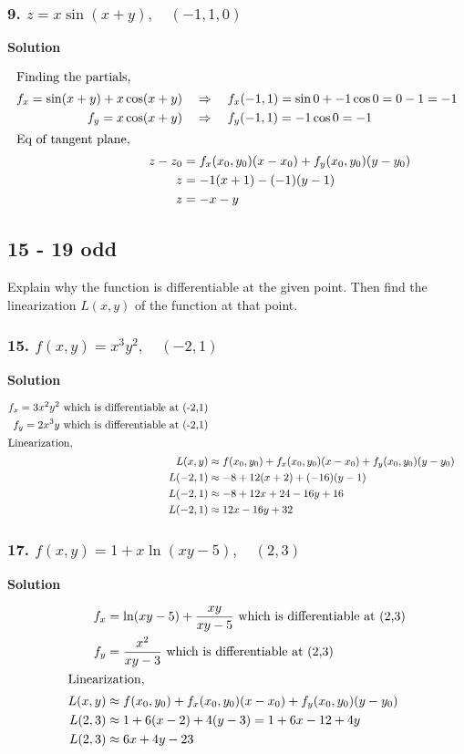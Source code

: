 \documentclass{article}
\newcommand\rr{\quad\Rightarrow\quad}
\newcommand{\solution}{\centerline{\textbf{Solution}}}
\begin{document}
\subsubsection*{9. $z = x\sin (x+y),\quad (-1, 1, 0)$}
\solution
\begin{align*}
    \intertext{Finding the partials,}
    f_x = \sin (x+y) + x\cos (x+y) &\rr f_x(-1,1) = \sin 0 + -1\cos 0 = 0 - 1 = -1 \\
    f_y = x\cos (x+y) &\rr f_y(-1,1) = -1\cos 0 = -1 \\
    \intertext{Eq of tangent plane,}
    z-z_0 &= f_x(x_0, y_0)(x-x_0) + f_y(x_0, y_0)(y-y_0) \\
    z &= -1(x+1) - (-1)(y-1) \\
    z &= -x - y 
\end{align*}
\subsection*{15 - 19 odd}
Explain why the function is differentiable at the given point. Then find the linearization $L(x,y)$ of the function at that point.
\subsubsection*{15. $f(x,y) = x^3y^2,\quad (-2,1)$}
\solution 
\begin{align*}
    f_x = 3x^2y^2 \text{ which is differentiable at (-2,1)} \\
    f_y = 2x^3y \text{ which is differentiable at (-2,1)} \\
    \intertext{Linearization,}
    L(x,y) &\approx f(x_0, y_0) + f_x(x_0,y_0)(x-x_0) + f_y(x_0,y_0)(y-y_0) \\
    L(-2,1) &\approx -8 + 12(x+2) + (-16)(y-1) \\
    L(-2,1) &\approx -8 + 12x + 24 - 16y + 16 \\
    L(-2,1) &\approx 12x - 16y + 32
\end{align*}
\subsubsection*{17. $f(x,y) = 1 + x\ln (xy-5),\quad (2,3)$}
\solution
\begin{align*}
    f_x &= \ln (xy-5) + \frac {xy}{xy-5} \text{ which is differentiable at (2,3)} \\
    f_y &= \frac {x^2} {xy-3} \text{ which is differentiable at (2,3)} \\
    \intertext{Linearization,}
    L(x,y) &\approx f(x_0, y_0) + f_x(x_0,y_0)(x-x_0) + f_y(x_0,y_0)(y-y_0) \\
    L(2,3) &\approx 1 + 6(x-2) + 4(y-3) = 1 + 6x -12 + 4y \\
    L(2,3) &\approx 6x + 4y - 23
\end{align*}
\end{document}
